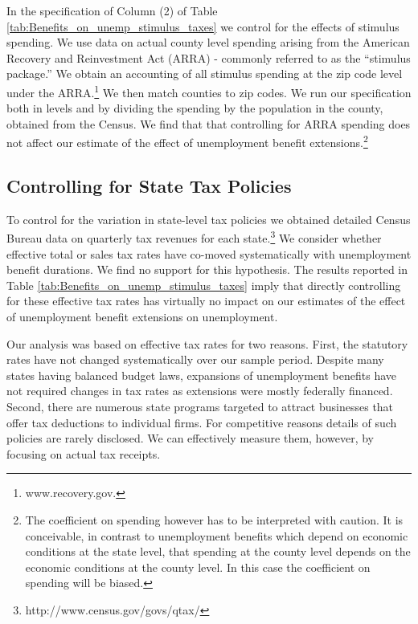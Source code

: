 \documentclass[12pt]{article}
\newcommand{\1}{\mathbf{1}}
\begin{document}
\begin{appendix}
In the specification of Column (2) of Table \ref{tab:Benefits_on_unemp_stimulus_taxes} we control for the effects of stimulus spending. We use data on actual county level spending arising from the American Recovery and Reinvestment Act (ARRA) - commonly referred to as the ``stimulus package.'' We obtain an accounting of all stimulus spending at the zip code level under the ARRA.\footnote{www.recovery.gov.}  We then match counties to zip codes.  We run our specification both in levels and by dividing the spending by the population in the county, obtained from the Census. We find that that controlling for ARRA spending does not affect our estimate of the effect of unemployment benefit extensions.\footnote{The coefficient on spending however has to be interpreted with caution. It is conceivable, in contrast to unemployment benefits which depend on economic conditions at the state level, that spending at the county level depends
on the economic conditions at the county level. In this case the coefficient on spending will be biased.}


\subsection{Controlling for State Tax Policies}

To control for the variation in state-level tax policies we obtained detailed Census Bureau data on quarterly tax revenues for each state.\footnote{http://www.census.gov/govs/qtax/} We consider whether effective total or sales tax rates have co-moved systematically with unemployment benefit durations. We find no support for this hypothesis. The results reported in Table \ref{tab:Benefits_on_unemp_stimulus_taxes} imply that directly controlling for these effective tax rates has virtually no impact on our estimates of the effect of unemployment benefit extensions on unemployment.

Our analysis was based on effective tax rates for two reasons. First, the statutory rates have not changed systematically over our sample period. Despite many states having balanced budget laws, expansions of unemployment benefits have not required changes in tax rates as extensions were mostly federally financed. Second, there are numerous state programs targeted to attract businesses that offer tax deductions to individual firms. For competitive reasons details of such policies are rarely disclosed. We can effectively measure them, however, by focusing on actual tax receipts.



\end{appendix}
\end{document}
